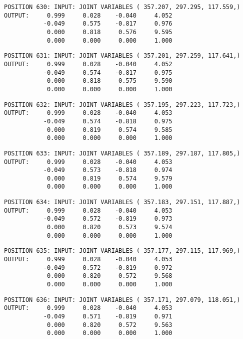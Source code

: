 \begin{verbatim}
POSITION 630: INPUT: JOINT VARIABLES ( 357.207, 297.295, 117.559,)
OUTPUT:     0.999     0.028    -0.040     4.052
           -0.049     0.575    -0.817     0.976
            0.000     0.818     0.576     9.595
            0.000     0.000     0.000     1.000
\end{verbatim} \pagebreak[1]\begin{verbatim}
POSITION 631: INPUT: JOINT VARIABLES ( 357.201, 297.259, 117.641,)
OUTPUT:     0.999     0.028    -0.040     4.052
           -0.049     0.574    -0.817     0.975
            0.000     0.818     0.575     9.590
            0.000     0.000     0.000     1.000
\end{verbatim} \pagebreak[1]\begin{verbatim}
POSITION 632: INPUT: JOINT VARIABLES ( 357.195, 297.223, 117.723,)
OUTPUT:     0.999     0.028    -0.040     4.053
           -0.049     0.574    -0.818     0.975
            0.000     0.819     0.574     9.585
            0.000     0.000     0.000     1.000
\end{verbatim} \pagebreak[1]\begin{verbatim}
POSITION 633: INPUT: JOINT VARIABLES ( 357.189, 297.187, 117.805,)
OUTPUT:     0.999     0.028    -0.040     4.053
           -0.049     0.573    -0.818     0.974
            0.000     0.819     0.574     9.579
            0.000     0.000     0.000     1.000
\end{verbatim} \pagebreak[1]\begin{verbatim}
POSITION 634: INPUT: JOINT VARIABLES ( 357.183, 297.151, 117.887,)
OUTPUT:     0.999     0.028    -0.040     4.053
           -0.049     0.572    -0.819     0.973
            0.000     0.820     0.573     9.574
            0.000     0.000     0.000     1.000
\end{verbatim} \pagebreak[1]\begin{verbatim}
POSITION 635: INPUT: JOINT VARIABLES ( 357.177, 297.115, 117.969,)
OUTPUT:     0.999     0.028    -0.040     4.053
           -0.049     0.572    -0.819     0.972
            0.000     0.820     0.572     9.568
            0.000     0.000     0.000     1.000
\end{verbatim} \pagebreak[1]\begin{verbatim}
POSITION 636: INPUT: JOINT VARIABLES ( 357.171, 297.079, 118.051,)
OUTPUT:     0.999     0.028    -0.040     4.053
           -0.049     0.571    -0.819     0.971
            0.000     0.820     0.572     9.563
            0.000     0.000     0.000     1.000
\end{verbatim} \pagebreak[1]\begin{verbatim}

\end{verbatim}
